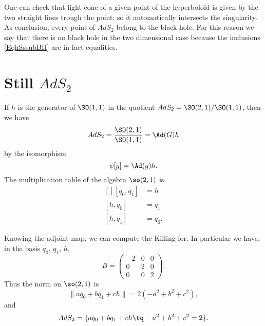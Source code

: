 One can check that light cone of a given point of the hyperboloid is given by the two straight lines trough the point; so it automatically intersects the singularity. As conclusion, every point of $AdS_2$ belong to the black hole. For this reason we say that there is no black hole in the two dimensional case because the inclusions \eqref{EqhSssubBH} are in fact equalities.

\section{Still \texorpdfstring{$AdS_2$}{AdS2}}

If $h$ is the generator of $\SO(1,1)$ in the quotient $AdS_2=\SO(2,1)/\SO(1,1)$, then we have
\begin{equation}
	AdS_2=\frac{ \SO(2,1) }{ \SO(1,1) }=\Ad(G)h
\end{equation}
by the isomorphism
\begin{equation}
	\psi[g]=\Ad(g)h.
\end{equation}
The multiplication table of the algebra $\so(2,1)$ is
\begin{equation}
	\begin{aligned}[]
		[q_0,q_1]&=h\\
		[h,q_0]&=q_1\\
		[h,q_1]&=q_0.
	\end{aligned}
\end{equation}

Knowing the adjoint map, we can compute the Killing for. In particular we have, in the basis $q_0$, $q_1$, $h$,
\begin{equation}
	B=\begin{pmatrix}
		  -2	&	0	&	0\\ 
		    0	&	2	&	0\\ 
		     0	&	0	& 	2	  
	     \end{pmatrix}.
\end{equation}
Thus the norm on $\so(2,1)$ is
\begin{equation}
	\| aq_0+bq_1+ch\| =2(-a^2+b^2+c^2),
\end{equation}
and
\begin{equation}
	AdS_2=\{ aq_0+bq_1+ch\tq -a^2+b^2+c^2=2 \}.
\end{equation}


